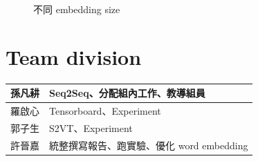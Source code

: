 \documentclass[12pt, a4paper]{article}
\theoremstyle{mystyle}	%
\begin{document}
\begin{figure}[!htb]
    \caption{不同 embedding size}
    \label{fig:esz}
   \endminipage
  \end{figure}

\section{Team division}
\begin{table}[h]
\centering
\begin{tabular}{ |C{2cm}|C{10cm}| }
  \hline
  孫凡耕 & Seq2Seq、分配組內工作、教導組員\\
  \hline
  羅啟心 & Tensorboard、Experiment\\
  \hline
  郭子生 & S2VT、Experiment\\
  \hline
  許晉嘉 & 統整撰寫報告、跑實驗、優化 word embedding\\
  \hline
\end{tabular}
\end{table}
\end{document}
